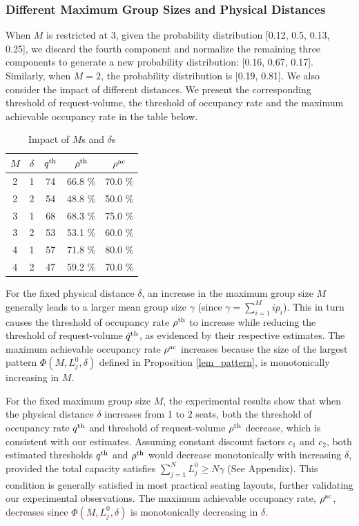 \subsubsection{Different Maximum Group Sizes and Physical Distances}
When $M$ is restricted at 3, given the probability distribution [0.12, 0.5, 0.13, 0.25], we discard the fourth component and normalize the remaining three components to generate a new probability distribution: [0.16, 0.67, 0.17]. Similarly, when $M =2$, the probability distribution is [0.19, 0.81].
We also consider the impact of different distances. We present the corresponding threshold of request-volume, the threshold of occupancy rate and the maximum achievable occupancy rate in the table below.

\begin{table}[ht]
  \centering
  \caption{Impact of $M$s and $\delta$s}
  \begin{tabular}{ccccc}
  \hline
  \hline
   $M$  & $\delta$ & $q^{\textup{th}}$ & $\rho^{\textup{th}}$ & $\rho^{\textup{ac}}$ \\
  \hline
   2 & 1 & 74  & 66.8 \% & 70.0 \% \\
   2 & 2 & 54  & 48.8 \% & 50.0 \% \\ 
   3 & 1 & 68  & 68.3 \% & 75.0 \% \\
   3 & 2 & 53  & 53.1 \% & 60.0 \% \\
   4 & 1 & 57  & 71.8 \% & 80.0 \% \\
   4 & 2 & 47  & 59.2 \% & 70.0 \% \\
   \hline
   \hline
  \end{tabular}
\end{table}


For the fixed physical distance $\delta$, an increase in the maximum group size $M$ generally leads to a larger mean group size $\gamma$ (since $\gamma = \sum_{i=1}^{M} i p_i$). This in turn causes the threshold of occupancy rate $\rho^{\textup{th}}$ to increase while reducing the threshold of request-volume $\tilde{q}^{\textup{th}}$, as evidenced by their respective estimates. The maximum achievable occupancy rate $\rho^{\textup{ac}}$ increases because the size of the largest pattern $\Phi(M, L_j^{0}, \delta)$ defined in Proposition \ref{lem_pattern}, is monotonically increasing in $M$.

For the fixed maximum group size $M$, the experimental results show that when the physical distance $\delta$ increases from 1 to 2 seats, both the threshold of occupancy rate $q^{\textup{th}}$ and threshold of request-volume $\rho^{\textup{th}}$ decrease, which is consistent with our estimates.
Assuming constant discount factors $c_1$ and $c_2$, both estimated thresholds $q^{\textup{th}}$ and  $\rho^{\textup{th}}$ would decrease monotonically with increasing $\delta$, provided the total capacity satisfies $\sum_{j=1}^{N} L_{j}^{0} \geq N \gamma$ (See Appendix). This condition is generally satisfied in most practical seating layouts, further validating our experimental observations. The maximum achievable occupancy rate, $\rho^{\textup{ac}}$, decreases since $\Phi(M, L_j^{0}, \delta)$ is monotonically decreasing in $\delta$.
 
